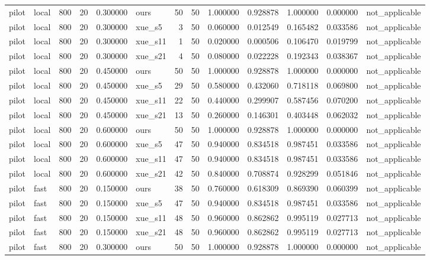 \begin{longtable}{llrrrlrrrrrrl}
pilot & local & 800 & 20 & 0.300000 & ours & 50 & 50 & 1.000000 & 0.928878 & 1.000000 & 0.000000 & not\_applicable \\
pilot & local & 800 & 20 & 0.300000 & xue\_s5 & 3 & 50 & 0.060000 & 0.012549 & 0.165482 & 0.033586 & not\_applicable \\
pilot & local & 800 & 20 & 0.300000 & xue\_s11 & 1 & 50 & 0.020000 & 0.000506 & 0.106470 & 0.019799 & not\_applicable \\
pilot & local & 800 & 20 & 0.300000 & xue\_s21 & 4 & 50 & 0.080000 & 0.022228 & 0.192343 & 0.038367 & not\_applicable \\
pilot & local & 800 & 20 & 0.450000 & ours & 50 & 50 & 1.000000 & 0.928878 & 1.000000 & 0.000000 & not\_applicable \\
pilot & local & 800 & 20 & 0.450000 & xue\_s5 & 29 & 50 & 0.580000 & 0.432060 & 0.718118 & 0.069800 & not\_applicable \\
pilot & local & 800 & 20 & 0.450000 & xue\_s11 & 22 & 50 & 0.440000 & 0.299907 & 0.587456 & 0.070200 & not\_applicable \\
pilot & local & 800 & 20 & 0.450000 & xue\_s21 & 13 & 50 & 0.260000 & 0.146301 & 0.403448 & 0.062032 & not\_applicable \\
pilot & local & 800 & 20 & 0.600000 & ours & 50 & 50 & 1.000000 & 0.928878 & 1.000000 & 0.000000 & not\_applicable \\
pilot & local & 800 & 20 & 0.600000 & xue\_s5 & 47 & 50 & 0.940000 & 0.834518 & 0.987451 & 0.033586 & not\_applicable \\
pilot & local & 800 & 20 & 0.600000 & xue\_s11 & 47 & 50 & 0.940000 & 0.834518 & 0.987451 & 0.033586 & not\_applicable \\
pilot & local & 800 & 20 & 0.600000 & xue\_s21 & 42 & 50 & 0.840000 & 0.708874 & 0.928299 & 0.051846 & not\_applicable \\
pilot & fast & 800 & 20 & 0.150000 & ours & 38 & 50 & 0.760000 & 0.618309 & 0.869390 & 0.060399 & not\_applicable \\
pilot & fast & 800 & 20 & 0.150000 & xue\_s5 & 47 & 50 & 0.940000 & 0.834518 & 0.987451 & 0.033586 & not\_applicable \\
pilot & fast & 800 & 20 & 0.150000 & xue\_s11 & 48 & 50 & 0.960000 & 0.862862 & 0.995119 & 0.027713 & not\_applicable \\
pilot & fast & 800 & 20 & 0.150000 & xue\_s21 & 48 & 50 & 0.960000 & 0.862862 & 0.995119 & 0.027713 & not\_applicable \\
pilot & fast & 800 & 20 & 0.300000 & ours & 50 & 50 & 1.000000 & 0.928878 & 1.000000 & 0.000000 & not\_applicable \\

\end{longtable}
